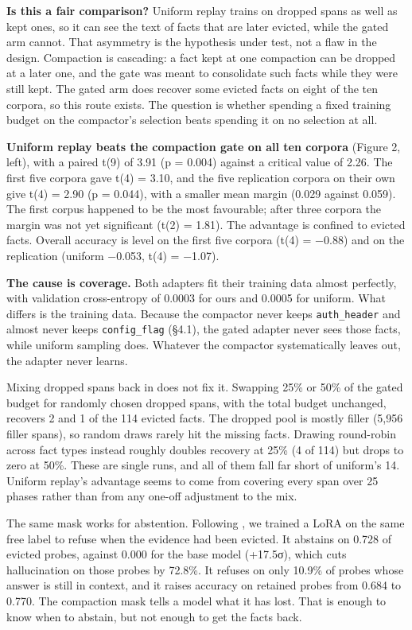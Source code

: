 \documentclass[10pt]{article}
\begin{document}
\textbf{Is this a fair comparison?} Uniform replay trains on dropped spans as well as kept ones,
so it can see the text of facts that are later evicted, while the gated arm cannot. That
asymmetry is the hypothesis under test, not a flaw in the design. Compaction is cascading: a
fact kept at one compaction can be dropped at a later one, and the gate was meant to
consolidate such facts while they were still kept. The gated arm does recover some evicted
facts on eight of the ten corpora, so this route exists. The question is whether spending a
fixed training budget on the compactor's selection beats spending it on no selection at all.

\textbf{Uniform replay beats the compaction gate on all ten corpora} (Figure 2, left), with a
paired t(9) of 3.91 (p = 0.004) against a critical value of 2.26. The first five corpora gave
t(4) = 3.10, and the five replication corpora on their own give t(4) = 2.90 (p = 0.044), with
a smaller mean margin (0.029 against 0.059). The first corpus happened to be the most
favourable; after three corpora the margin was not yet significant (t(2) = 1.81). The
advantage is confined to evicted facts. Overall accuracy is level on the first five corpora
(t(4) = −0.88) and on the replication (uniform −0.053, t(4) = −1.07).

\textbf{The cause is coverage.} Both adapters fit their training data almost perfectly, with
validation cross-entropy of 0.0003 for ours and 0.0005 for uniform. What differs is the
training data. Because the compactor never keeps \texttt{auth\_header} and almost never keeps
\texttt{config\_flag} (§4.1), the gated adapter never sees those facts, while uniform sampling does.
Whatever the compactor systematically leaves out, the adapter never learns.

Mixing dropped spans back in does not fix it. Swapping 25\% or 50\% of the gated budget for
randomly chosen dropped spans, with the total budget unchanged, recovers 2 and 1 of the 114
evicted facts. The dropped pool is mostly filler (5,956 filler spans), so random draws rarely
hit the missing facts. Drawing round-robin across fact types instead roughly doubles recovery
at 25\% (4 of 114) but drops to zero at 50\%. These are single runs, and all of them fall far
short of uniform's 14. Uniform replay's advantage seems to come from covering every span over
25 phases rather than from any one-off adjustment to the mix.

The same mask works for abstention. Following \citet{khodabandehlou2026abstention}, we trained a LoRA on the same free
label to refuse when the evidence had been evicted. It abstains on 0.728 of evicted probes,
against 0.000 for the base model (+17.5σ), which cuts hallucination on those probes by 72.8\%.
It refuses on only 10.9\% of probes whose answer is still in context, and it raises accuracy
on retained probes from 0.684 to 0.770. The compaction mask tells a model what it has lost.
That is enough to know when to abstain, but not enough to get the facts back.
\end{document}
